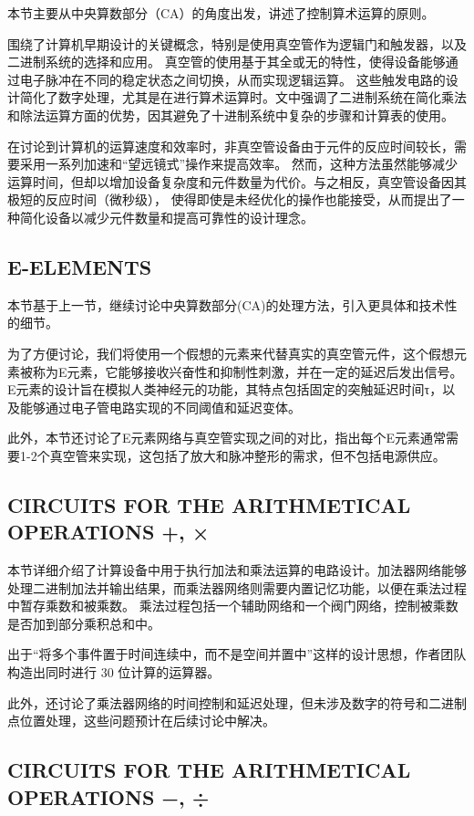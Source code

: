 \documentclass[12pt]{article} %
\theoremstyle{definition}
\begin{document}
本节主要从中央算数部分（CA）的角度出发，讲述了控制算术运算的原则。

围绕了计算机早期设计的关键概念，特别是使用真空管作为逻辑门和触发器，以及二进制系统的选择和应用。
真空管的使用基于其全或无的特性，使得设备能够通过电子脉冲在不同的稳定状态之间切换，从而实现逻辑运算。
这些触发电路的设计简化了数字处理，尤其是在进行算术运算时。文中强调了二进制系统在简化乘法和除法运算方面的优势，因其避免了十进制系统中复杂的步骤和计算表的使用。

在讨论到计算机的运算速度和效率时，非真空管设备由于元件的反应时间较长，需要采用一系列加速和“望远镜式”操作来提高效率。
然而，这种方法虽然能够减少运算时间，但却以增加设备复杂度和元件数量为代价。与之相反，真空管设备因其极短的反应时间（微秒级），
使得即使是未经优化的操作也能接受，从而提出了一种简化设备以减少元件数量和提高可靠性的设计理念。

\subsection{E-ELEMENTS}

本节基于上一节，继续讨论中央算数部分(CA)的处理方法，引入更具体和技术性的细节。

为了方便讨论，我们将使用一个假想的元素来代替真实的真空管元件，这个假想元素被称为E元素，它能够接收兴奋性和抑制性刺激，并在一定的延迟后发出信号。
E元素的设计旨在模拟人类神经元的功能，其特点包括固定的突触延迟时间τ，以及能够通过电子管电路实现的不同阈值和延迟变体。

此外，本节还讨论了E元素网络与真空管实现之间的对比，指出每个E元素通常需要1-2个真空管来实现，这包括了放大和脉冲整形的需求，但不包括电源供应。

\subsection{CIRCUITS FOR THE ARITHMETICAL OPERATIONS +, ×}

本节详细介绍了计算设备中用于执行加法和乘法运算的电路设计。加法器网络能够处理二进制加法并输出结果，而乘法器网络则需要内置记忆功能，以便在乘法过程中暂存乘数和被乘数。
乘法过程包括一个辅助网络和一个阀门网络，控制被乘数是否加到部分乘积总和中。

出于“将多个事件置于时间连续中，而不是空间并置中”这样的设计思想，作者团队构造出同时进行 30 位计算的运算器。

此外，还讨论了乘法器网络的时间控制和延迟处理，但未涉及数字的符号和二进制点位置处理，这些问题预计在后续讨论中解决。

\subsection{CIRCUITS FOR THE ARITHMETICAL OPERATIONS −, ÷}
\end{document}
